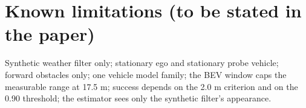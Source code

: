\documentclass[11pt,a4paper]{article}
\begin{document}
\section{Known limitations (to be stated in the paper)}
Synthetic weather filter only; stationary ego and stationary probe vehicle; forward obstacles only; one vehicle model family; the BEV window caps the measurable range at 17.5 m; success depends on the 2.0 m criterion and on the 0.90 threshold; the estimator sees only the synthetic filter's appearance.
\end{document}

